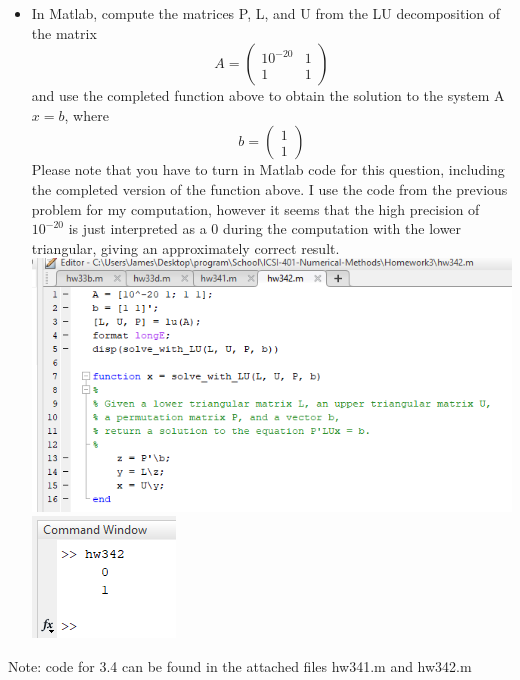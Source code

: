 \documentclass{article}
\begin{document}
\begin{itemize}
    \newpage
    \item In Matlab, compute the matrices P, L, and U from the LU decomposition of the matrix
    \[A = \begin{pmatrix}10^{-20} & 1 \\ 1 & 1 \end{pmatrix}\]
    and use the completed function above to obtain the solution to the system A$x = b$, where
    \[b = \begin{pmatrix}1 \\ 1 \end{pmatrix}\] Please note that you have to turn in Matlab code for this question, including the completed version of the function above.
    \newline\newline
    I use the code from the previous problem for my computation, however it seems that the high precision of $10^{-20}$ is just interpreted as a 0 during the computation with the lower triangular, giving an approximately correct result.   
    \newline\newline
    \includegraphics[scale=0.4]{Homework3/3.4.2.png}
    \newline
    \includegraphics[scale=0.4]{Homework3/res3.4.2.png}
    \newline
\end{itemize}

Note: code for 3.4 can be found in the attached files hw341.m and hw342.m
\end{document}
